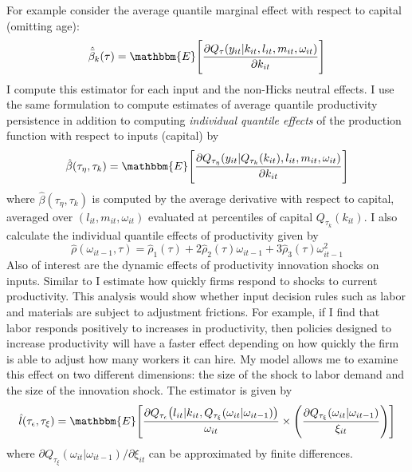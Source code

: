 \documentclass{article}
\begin{document}
For example consider the average quantile marginal effect with respect to capital (omitting age):
\begin{equation*}
\hat{\bar{\beta}}_{k}(\tau)=\mathbbm{E}\Bigg[\frac{\partial Q_{\tau}(y_{it}|k_{it}, l_{it}, m_{it}, \omega_{it})}{\partial k_{it}}\Bigg]
\end{equation*}
I compute this estimator for each input and the non-Hicks neutral effects. I use the same formulation to compute estimates of average quantile productivity persistence in addition to computing \textit{individual quantile effects} of the production function with respect to inputs (capital) by
\begin{equation*}
\hat{\beta}(\tau_{\eta}, \tau_{k})=\mathbbm{E}\Bigg[\frac{\partial Q_{\tau_{\eta}}(y_{it}|Q_{\tau_{k}}(k_{it}), l_{it}, m_{it}, \omega_{it})}{\partial k_{it}}\Bigg]
\end{equation*}
where $\hat{\beta}(\tau_{\eta}, \tau_{k})$ is computed by the average derivative with respect to capital, averaged over $(l_{it},m_{it},\omega_{it})$ evaluated at percentiles of capital $Q_{\tau_{k}}(k_{it})$. I also calculate the individual quantile effects of productivity given by
\begin{equation*}
\hat{\rho}(\omega_{it-1},\tau)=\hat{\rho}_{1}(\tau)+2\hat{\rho}_{2}(\tau)\omega_{it-1}+3\hat{\rho}_{3}(\tau)\omega^{2}_{it-1}
\end{equation*}
Also of interest are the dynamic effects of productivity innovation shocks on inputs. Similar to \cite{Hu2019} I estimate how quickly firms respond to shocks to current productivity. This analysis would show whether input decision rules such as labor and materials are subject to adjustment frictions. For example, if I find that labor responds positively to increases in productivity, then policies designed to increase productivity will have a faster effect depending on how quickly the firm is able to adjust how many workers it can hire. My model allows me to examine this effect on two different dimensions: the size of the shock to labor demand and the size of the innovation shock. The estimator is given by 
\begin{equation*}
\hat{l}(\tau_{\epsilon}, \tau_{\xi})=\mathbbm{E}\Bigg[\frac{\partial Q_{\tau_{\epsilon}}\big(l_{it}|k_{it},Q_{\tau_{\xi}}(\omega_{it}|\omega_{it-1})\big)}{\omega_{it}}\times\Bigg(\frac{\partial Q_{\tau_{\xi}}(\omega_{it}|\omega_{it-1})}{\xi_{it}}\Bigg)\Bigg]
\end{equation*}
where $\partial Q_{\tau_{\xi}}(\omega_{it}|\omega_{it-1})/\partial \xi_{it}$ can be approximated by finite differences.
\end{document}
